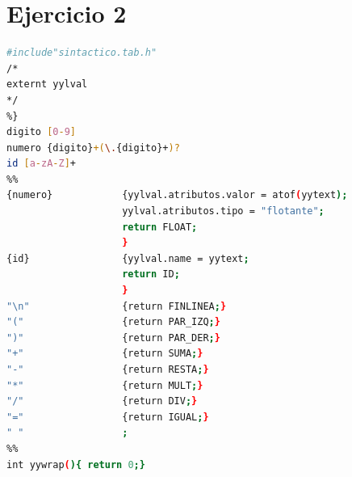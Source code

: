 \documentclass[12pt]{article}
\begin{document}
\clearpage
\newpage

\section{Ejercicio 2}

\begin{lstlisting}[language=bash,frame=single,style=CStyle,caption={lexico.l}]
%{
#include"sintactico.tab.h"
/*
externt yylval
*/
%}
digito [0-9]
numero {digito}+(\.{digito}+)?
id [a-zA-Z]+
%%
{numero}            {yylval.atributos.valor = atof(yytext);
                    yylval.atributos.tipo = "flotante";   
                    return FLOAT;
                    }
{id}                {yylval.name = yytext; 
                    return ID;
                    }
"\n"                {return FINLINEA;}
"("                 {return PAR_IZQ;}
")"                 {return PAR_DER;}
"+"                 {return SUMA;}
"-"                 {return RESTA;}
"*"                 {return MULT;}
"/"                 {return DIV;}
"="                 {return IGUAL;}
" "                 ;
%%
int yywrap(){ return 0;}
\end{lstlisting}
\end{document}
